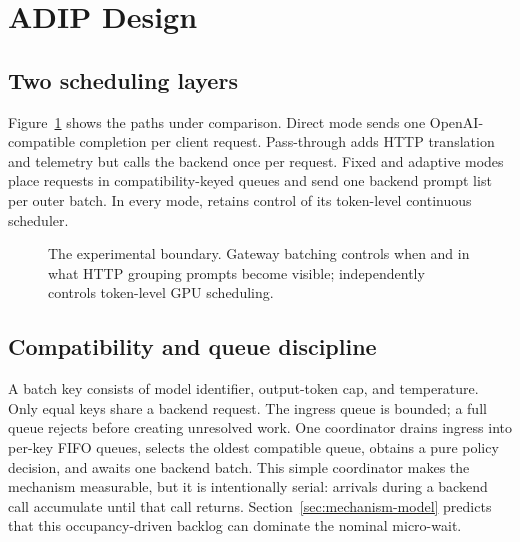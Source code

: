 \section{ADIP Design}
\label{sec:design}

\subsection{Two scheduling layers}

Figure~\ref{fig:architecture} shows the paths under comparison. Direct mode
sends one OpenAI-compatible completion per client request. Pass-through adds
HTTP translation and telemetry but calls the backend once per request. Fixed
and adaptive modes place requests in compatibility-keyed queues and send one
backend prompt list per outer batch. In every mode, \vllm{} retains control of
its token-level continuous scheduler.

\begin{figure}[t]
  \centering
  \caption{The experimental boundary. Gateway batching controls when and in
  what HTTP grouping prompts become visible; \vllm{} independently controls
  token-level GPU scheduling.}
  \label{fig:architecture}
\end{figure}

\subsection{Compatibility and queue discipline}

A batch key consists of model identifier, output-token cap, and temperature.
Only equal keys share a backend request. The ingress queue is bounded; a full
queue rejects before creating unresolved work. One coordinator drains ingress
into per-key FIFO queues, selects the oldest compatible queue, obtains a pure
policy decision, and awaits one backend batch. This simple coordinator makes
the mechanism measurable, but it is intentionally serial: arrivals during a
backend call accumulate until that call returns. Section~\ref{sec:mechanism-model}
predicts that this occupancy-driven backlog can dominate the nominal
micro-wait.

